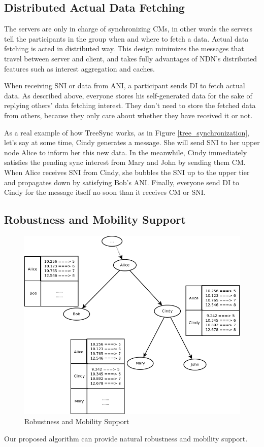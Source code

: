 \documentclass[conference]{IEEEtran}
\begin{document}
\subsection{Distributed Actual Data Fetching}
The servers are only in charge of synchronizing CMs,
in other words the servers tell the participants in the group when and where to fetch a data.
Actual data fetching is acted in distributed way.
This design minimizes the messages that travel between server and client,
and takes fully advantages of NDN's distributed features such as interest aggregation and caches.

When receiving SNI or data from ANI,
a participant sends DI to fetch actual data.
As described above, everyone stores his self-generated data for the sake of replying others' data fetching interest.
They don't need to store the fetched data from others,
because they only care about whether they have received it or not.

As a real example of how TreeSync works, as in Figure \ref{tree_synchronization},
let's say at some time, Cindy generates a message.
She will send SNI to her upper node Alice to inform her this new data.
In the meanwhile, Cindy immediately satisfies the pending sync interest from Mary and John
by sending them CM.
When Alice receives SNI from Cindy,
she bubbles the SNI up to the upper tier and propagates down by satisfying Bob's ANI.
Finally, everyone send DI to Cindy for the message itself no soon than it receives CM or SNI.

\subsection{Robustness and Mobility Support}
\label{mobility}
\begin{figure}[!t]
\centering
\includegraphics[width=4.5in]{../png/mobility.png}
\caption{Robustness and Mobility Support}
\label{mobility_pic}
\end{figure}
Our proposed algorithm can provide natural robustness and mobility support.
\end{document}
